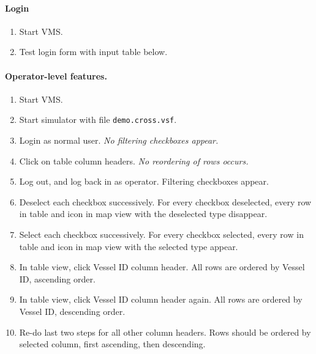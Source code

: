 \documentclass{article}
\begin{document}
\paragraph{Login}
\begin{enumerate}
\item Start VMS.
\item Test login form with input table below.
\end{enumerate}

\begin{table}[ht]
\end{table}

\paragraph{Operator-level features.}
\begin{enumerate}
\item Start VMS.
\item Start simulator with file \verb|demo.cross.vsf|.
\item Login as normal user. \emph{No filtering checkboxes appear.}
\item Click on table column headers. \emph{No reordering of rows occurs.}
\item Log out, and log back in as operator. {Filtering checkboxes appear.}
\item Deselect each checkbox successively. {For every checkbox deselected, every row in table and icon in map view with the deselected type disappear.}
\item Select each checkbox successively. {For every checkbox selected, every row in table and icon in map view with the selected type appear.}
\item In table view, click Vessel ID column header. {All rows are ordered by Vessel ID, ascending order.}
\item In table view, click Vessel ID column header again. {All rows are ordered by Vessel ID, descending order.}
\item Re-do last two steps for all other column headers. {Rows should be ordered by selected column, first ascending, then descending.}
\end{enumerate}
\end{document}
